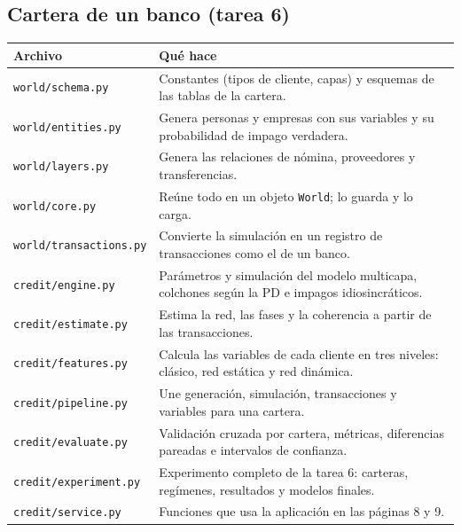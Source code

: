 \subsection*{Cartera de un banco (tarea 6)}
\begin{longtable}{L{0.24\textwidth}L{0.68\textwidth}}
\toprule
\textbf{Archivo} & \textbf{Qué hace} \\
\midrule
\endhead
\texttt{world/schema.py} & Constantes (tipos de cliente, capas) y esquemas de las tablas
de la cartera. \\
\texttt{world/entities.py} & Genera personas y empresas con sus variables y su
probabilidad de impago verdadera. \\
\texttt{world/layers.py} & Genera las relaciones de nómina, proveedores y
transferencias. \\
\texttt{world/core.py} & Reúne todo en un objeto \texttt{World}; lo guarda y lo carga. \\
\texttt{world/transactions.py} & Convierte la simulación en un registro de
transacciones como el de un banco. \\
\texttt{credit/engine.py} & Parámetros y simulación del modelo multicapa, colchones según
la PD e impagos idiosincráticos. \\
\texttt{credit/estimate.py} & Estima la red, las fases y la coherencia a partir de las
transacciones. \\
\texttt{credit/features.py} & Calcula las variables de cada cliente en tres niveles:
clásico, red estática y red dinámica. \\
\texttt{credit/pipeline.py} & Une generación, simulación, transacciones y variables para
una cartera. \\
\texttt{credit/evaluate.py} & Validación cruzada por cartera, métricas, diferencias
pareadas e intervalos de confianza. \\
\texttt{credit/experiment.py} & Experimento completo de la tarea 6: carteras, regímenes,
resultados y modelos finales. \\
\texttt{credit/service.py} & Funciones que usa la aplicación en las páginas 8 y 9. \\
\bottomrule
\end{longtable}

